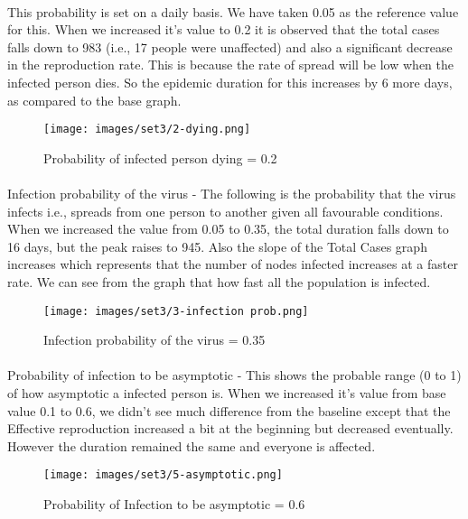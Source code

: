 \documentclass[12pt, a4paper]{extarticle}
\begin{document}
    \newpage
    \paragraph{}This probability is set on a daily basis. We have taken 0.05 as the reference value for this. When we increased it's value to 0.2 it is observed that the total cases falls down to 983 (i.e., 17 people were unaffected) and also a significant decrease in the reproduction rate. This is because the rate of spread will be low when the infected person dies. So the epidemic duration for this increases by 6 more days, as compared to the base graph.
    \vspace{0.2in}
    \begin{figure}[h]
        \centering
        \texttt{[image: images/set3/2-dying.png]}
        \caption{Probability of infected person dying = 0.2}
    \end{figure}
    
    \newpage
    \paragraph{} Infection probability of the virus - The following is the probability that the virus infects i.e., spreads from one person to another given all favourable conditions. When we increased the value from 0.05 to 0.35, the total duration falls down to 16 days, but the peak raises to 945. Also the slope of the Total Cases graph increases which represents that the number of nodes infected increases at a faster rate. We can see from the graph that how fast all the population is infected.
    \vspace{0.2in}
    \begin{figure}[h]
        \centering
        \texttt{[image: images/set3/3-infection prob.png]}
        \caption{Infection probability of the virus = 0.35}
    \end{figure}
    
    \newpage
    \paragraph{} Probability of infection to be asymptotic - This shows the probable range (0 to 1) of how asymptotic a infected person is. When we increased it's value from base value 0.1 to 0.6, we didn't see much difference from the baseline except that the Effective reproduction increased a bit at the beginning but decreased eventually. However the duration remained the same and everyone is affected.
    \vspace{0.2in}
    \begin{figure}[h]
        \centering
        \texttt{[image: images/set3/5-asymptotic.png]}
        \caption{Probability of Infection to be asymptotic = 0.6}
    \end{figure}
    
\end{document}

